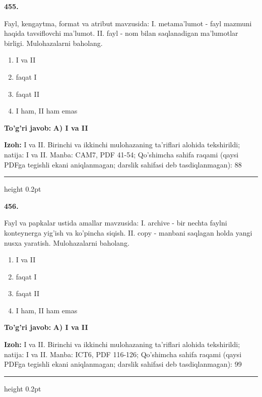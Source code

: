 \documentclass[10pt,a4paper]{article}
\begin{document}
{\bfseries\sffamily\color{ink} 455.}
\par
Fayl, kengaytma, format va atribut mavzusida: I. metama'lumot - fayl mazmuni haqida tavsiflovchi ma'lumot. II. fayl - nom bilan saqlanadigan ma'lumotlar birligi. Mulohazalarni baholang.
\begin{enumerate}[label=\Alph*),leftmargin=9mm]
\item I va II
\item faqat I
\item faqat II
\item I ham, II ham emas
\end{enumerate}
\begin{tcolorbox}[enhanced,breakable,colback=teal!4,colframe=teal!60!black,boxrule=0.45pt,arc=1.2mm,left=2.7mm,right=2.7mm,top=1.8mm,bottom=1.8mm,before skip=2mm,after skip=2mm]
{\bfseries\sffamily\color{teal}To'g'ri javob:} \textbf{A) I va II}
\par\smallskip
{\bfseries Izoh:} I va II. Birinchi va ikkinchi mulohazaning ta'riflari alohida tekshirildi; natija: I va II. Manba: CAM7, PDF 41-54; Qo'shimcha sahifa raqami (qaysi PDFga tegishli ekani aniqlanmagan; darslik sahifasi deb tasdiqlanmagan): 88
\end{tcolorbox}
\vspace{2mm}\hrule height 0.2pt\vspace{3mm}

{\bfseries\sffamily\color{ink} 456.}
\par
Fayl va papkalar ustida amallar mavzusida: I. archive - bir nechta faylni konteynerga yig'ish va ko'pincha siqish. II. copy - manbani saqlagan holda yangi nusxa yaratish. Mulohazalarni baholang.
\begin{enumerate}[label=\Alph*),leftmargin=9mm]
\item I va II
\item faqat I
\item faqat II
\item I ham, II ham emas
\end{enumerate}
\begin{tcolorbox}[enhanced,breakable,colback=teal!4,colframe=teal!60!black,boxrule=0.45pt,arc=1.2mm,left=2.7mm,right=2.7mm,top=1.8mm,bottom=1.8mm,before skip=2mm,after skip=2mm]
{\bfseries\sffamily\color{teal}To'g'ri javob:} \textbf{A) I va II}
\par\smallskip
{\bfseries Izoh:} I va II. Birinchi va ikkinchi mulohazaning ta'riflari alohida tekshirildi; natija: I va II. Manba: ICT6, PDF 116-126; Qo'shimcha sahifa raqami (qaysi PDFga tegishli ekani aniqlanmagan; darslik sahifasi deb tasdiqlanmagan): 99
\end{tcolorbox}
\vspace{2mm}\hrule height 0.2pt\vspace{3mm}
\end{document}
